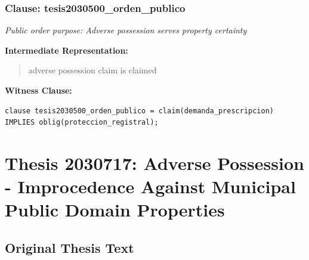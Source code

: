 \documentclass[11pt,a4paper]{article}
\begin{document}
\subsubsection{Clause: tesis2030500\_orden\_publico}

\textit{Public order purpose: Adverse possession serves property certainty}

\textbf{Intermediate Representation:}

\begin{quote}
adverse possession claim is claimed
\end{quote}

\textbf{Witness Clause:}

\begin{lstlisting}[style=witnessstyle, language=Witness]
clause tesis2030500_orden_publico = claim(demanda_prescripcion) IMPLIES oblig(proteccion_registral);
\end{lstlisting}

\newpage

\section{Thesis 2030717: Adverse Possession - Improcedence Against Municipal Public Domain Properties}
\label{thesis:2030717}

\subsection{Original Thesis Text}
\end{document}
